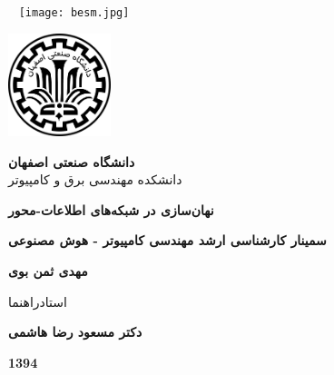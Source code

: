 
\thispagestyle{empty}
\begin{center}
	~\vfill
	\texttt{[image: besm.jpg]}
	~\vfill
\end{center}
\pagebreak

\thispagestyle{empty}
\begin{center}
\includegraphics[height=3cm]{iut_logo.png}
\vspace{0.5cm}

{\large
	\textbf{دانشگاه صنعتی اصفهان}\\
	دانشکده مهندسی برق و کامپیوتر
}
\vspace{3.5cm}

{\LARGE
	\textbf{نهان‌سازی در شبکه‌های اطلاعات-محور}\\
}
\vspace{3.5cm}

{\large
	\textbf{سمینار کارشناسی ارشد مهندسی کامپیوتر - هوش مصنوعی}\\
}
\vspace{1cm}

{\Large
	\textbf{مهدی ثمن بوی}\\
}
\vspace{2.5cm}

{\large
	استادراهنما\\
}
\vspace{0.5cm}

{\Large
	\textbf{دکتر مسعود رضا هاشمی}\\
}
\vspace{3.5cm}

{\Large
	\textbf{1394}
}

\end{center}
\restoregeometry
\pagebreak

\thispagestyle{empty}
\vspace*{3cm}

